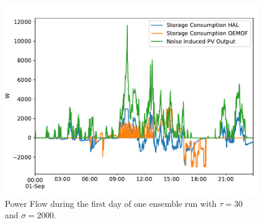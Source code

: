 \documentclass[a4paper,12pt]{book}
\theoremstyle{break}
\begin{document}
\begin{figure}[htp]
	\centering
	\includegraphics[width=\textwidth]{noiseExample}
	\caption{Power Flow during the first day of one ensemble run with $\tau = 30$ and $\sigma=2000$. }
	\label{f/res/noise/noiseExample}
\end{figure}
\newpage
\end{document}
